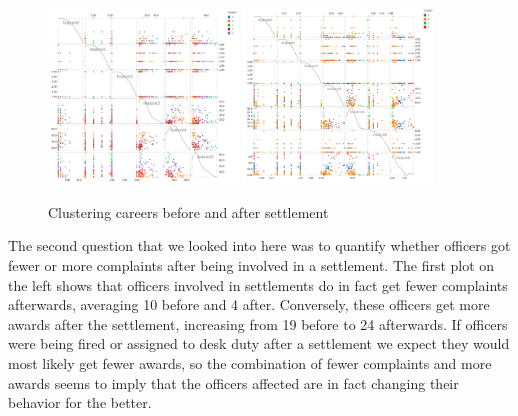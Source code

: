 \documentclass[11pt]{article}
\begin{document}
\begin{figure}[h!]
\centering
\caption{Clustering careers before and after settlement}
\includegraphics[width=0.45\textwidth]{cluster.png}
\includegraphics[width=0.45\textwidth]{cluster2.png}
\end{figure}

The second question that we looked into here was to quantify whether officers got fewer or more complaints after being involved in a settlement. The first plot on the left shows that officers involved in settlements do in fact get fewer complaints afterwards, averaging 10 before and 4 after. Conversely, these officers get more awards after the settlement, increasing from 19 before to 24 afterwards. If officers were being fired or assigned to desk duty after a settlement we expect they would most likely get fewer awards, so the combination of fewer complaints and more awards seems to imply that the officers affected are in fact changing their behavior for the better.
\end{document}
